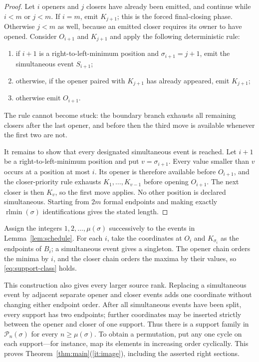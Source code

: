 \documentclass[a4paper,10pt]{amsart}
\theoremstyle{remark}
\newcommand{\rtlmin}{\operatorname{rlmin}}
\begin{document}
\begin{proof}
Let $i$ openers and $j$ closers have already been emitted, and continue while
$i<m$ or $j<m$.  If $i=m$, emit $K_{j+1}$; this is the forced final-closing
phase.  Otherwise $j<m$ as well, because an emitted closer requires its
owner to have opened.  Consider $O_{i+1}$ and $K_{j+1}$ and apply the
following deterministic rule:
\begin{enumerate}
\item if $i+1$ is a right-to-left-minimum position and
$\sigma_{i+1}=j+1$, emit the simultaneous event $S_{i+1}$;
\item otherwise, if the opener paired with $K_{j+1}$ has already appeared,
emit $K_{j+1}$;
\item otherwise emit $O_{i+1}$.
\end{enumerate}
The rule cannot become stuck: the boundary branch exhausts all remaining
closers after the last opener, and before then the third move is available
whenever the first two are not.

It remains to show that every designated simultaneous event is reached.  Let
$i+1$ be a right-to-left-minimum position and put $v=\sigma_{i+1}$.  Every
value smaller than $v$ occurs at a position at most $i$.  Its opener is
therefore available before $O_{i+1}$, and the closer-priority rule exhausts
$K_1,\ldots,K_{v-1}$ before opening $O_{i+1}$.  The next closer is then
$K_v$, so the first move applies.  No other position is declared
simultaneous.  Starting from $2m$ formal endpoints and making exactly
$\rtlmin(\sigma)$ identifications gives the stated length.
\end{proof}

Assign the integers $1,2,\ldots,\mu(\sigma)$ successively to the events in
Lemma~\ref{lem:schedule}.  For each $i$, take the coordinates at $O_i$ and
$K_{\sigma_i}$ as the endpoints of $B_i$; a simultaneous event gives a
singleton.  The opener chain orders the minima by $i$, and the closer chain
orders the maxima by their values, so \eqref{eq:support-class} holds.

This construction also gives every larger source rank.  Replacing a
simultaneous event by adjacent separate opener and closer events adds one
coordinate without changing either endpoint order.  After all simultaneous
events have been split, every support has two endpoints; further coordinates
may be inserted strictly between the opener and closer of one support.  Thus
there is a support family in $\mathcal P_n(\sigma)$ for every
$n\ge\mu(\sigma)$.  To obtain a permutation, put any one cycle on each
support---for instance, map its elements in increasing order cyclically.
This proves Theorem~\ref{thm:main}(\ref{it:image}), including the asserted
right sections.
\end{document}
